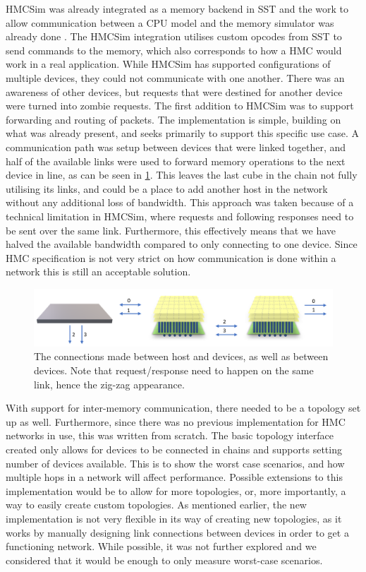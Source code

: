 HMCSim was already integrated as a memory backend in SST and the work to allow communication between a CPU model and the memory simulator was already done \cite{voskuilen2018sst}. The HMCSim integration utilises custom opcodes from SST to send commands to the memory, which also corresponds to how a HMC would work in a real application. While HMCSim has supported configurations of multiple devices, they could not communicate with one another. There was an awareness of other devices, but requests that were destined for another device were turned into zombie requests. The first addition to HMCSim was to support forwarding and routing of packets. The implementation is simple, building on what was already present, and seeks primarily to support this specific use case. A communication path was setup between devices that were linked together, and half of the available links were used to forward memory operations to the next device in line, as can be seen in \ref{HMCSim-network}. This leaves the last cube in the chain not fully utilising its links, and could be a place to add another host in the network without any additional loss of bandwidth. This approach was taken because of a technical limitation in HMCSim, where requests and following responses need to be sent over the same link. Furthermore, this effectively means that we have halved the available bandwidth compared to only connecting to one device. Since HMC specification is not very strict on how communication is done within a network this is still an acceptable solution.
\bigskip

\begin{figure}[!ht]
\centering
\includegraphics[width=0.75\linewidth]{figure/HMCSim-network.png}
\caption{The connections made between host and devices, as well as between devices. Note that request/response need to happen on the same link, hence the zig-zag appearance.}
\label{HMCSim-network}
\end{figure}

With support for inter-memory communication, there needed to be a topology set up as well. Furthermore, since there was no previous implementation for HMC networks in use, this was written from scratch. The basic topology interface created only allows for devices to be connected in chains and supports setting number of devices available. This is to show the worst case scenarios, and how multiple hops in a network will affect performance. Possible extensions to this implementation would be to allow for more topologies, or, more importantly, a way to easily create custom topologies. As mentioned earlier, the new implementation is not very flexible in its way of creating new topologies, as it works by manually designing link connections between devices in order to get a functioning network. While possible, it was not further explored and we considered that it would be enough to only measure worst-case scenarios.
\bigskip

